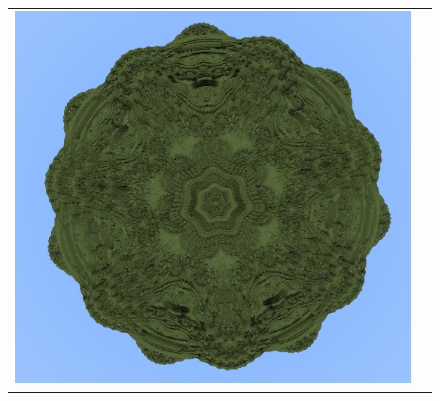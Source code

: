 \begin{figure}[ht]
\begin{tabular}{cc}
      \includegraphics[scale=0.33]{img/C8/mandelbub-2.png} \\    

\end{tabular}
\end{figure}
